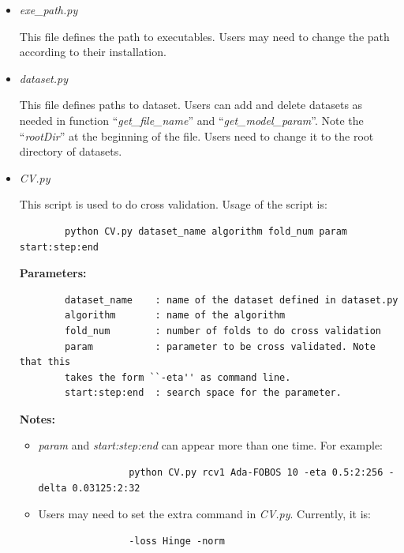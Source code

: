 \documentclass[11pt,a4paper]{article}
\newlength{\wideitemsep}
\let\olditem\item
\renewcommand{\item}{\setlength{\itemsep}{\wideitemsep}\olditem}
\begin{document}
\begin{itemize}
    \item \emph{exe\_path.py}

        This file defines the path to executables. Users may need to change the
        path according to their installation.
    \item \emph{dataset.py}

        This file defines paths to dataset. Users can add and delete datasets
        as needed in function ``\emph{get\_file\_name}'' and
        ``\emph{get\_model\_param}''.  Note the ``\emph{rootDir}'' at the
        beginning of the file. Users need to change it to the root directory of
        datasets.

    \item \emph{CV.py}

        This  script is used to do cross validation. Usage of the script is:
        \lstset{language=python,
            framexleftmargin=-1cm,
            xleftmargin=-1cm,
        }
        \begin{lstlisting}
        python CV.py dataset_name algorithm fold_num param start:step:end
        \end{lstlisting}

        \textbf{Parameters:}
        \lstset{language=bash,
            framexleftmargin=-1cm,
            xleftmargin=-1cm,
        }

        \begin{lstlisting}
        dataset_name    : name of the dataset defined in dataset.py
        algorithm       : name of the algorithm
        fold_num        : number of folds to do cross validation
        param           : parameter to be cross validated. Note that this
        takes the form ``-eta'' as command line.
        start:step:end  : search space for the parameter.
        \end{lstlisting}

        \textbf{Notes:}
        \begin{itemize}
            \item \emph{param} and \emph{start:step:end} can appear more than
                one time. For example:
                \lstset{language=python,
                    framexleftmargin=-3cm,
                    xleftmargin=-3cm,
                }
                \begin{lstlisting}
                python CV.py rcv1 Ada-FOBOS 10 -eta 0.5:2:256 -delta 0.03125:2:32
                \end{lstlisting}
            \item Users may need to set the extra command in \emph{CV.py}.
                Currently, it is:
                \lstset{language=python}
                \begin{lstlisting}
                -loss Hinge -norm
                \end{lstlisting}


\end{itemize}
\end{itemize}
\end{document}
